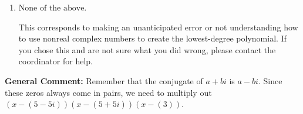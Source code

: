 \documentclass{extbook}[14pt]
\begin{document}
\begin{enumerate}
{\begin{enumerate}[label=\Alph*.]
$x^{3} + x^{2} -8 x + 15$, which corresponds to multiplying out $(x -5)(x -3)$.
\item \( \text{None of the above.} \)

This corresponds to making an unanticipated error or not understanding how to use nonreal complex numbers to create the lowest-degree polynomial. If you chose this and are not sure what you did wrong, please contact the coordinator for help.
\end{enumerate}

\textbf{General Comment:} Remember that the conjugate of $a+bi$ is $a-bi$. Since these zeros always come in pairs, we need to multiply out $(x-(5 - 5 i))(x-(5 + 5 i))(x-(3))$.
}
\end{enumerate}
\end{document}

